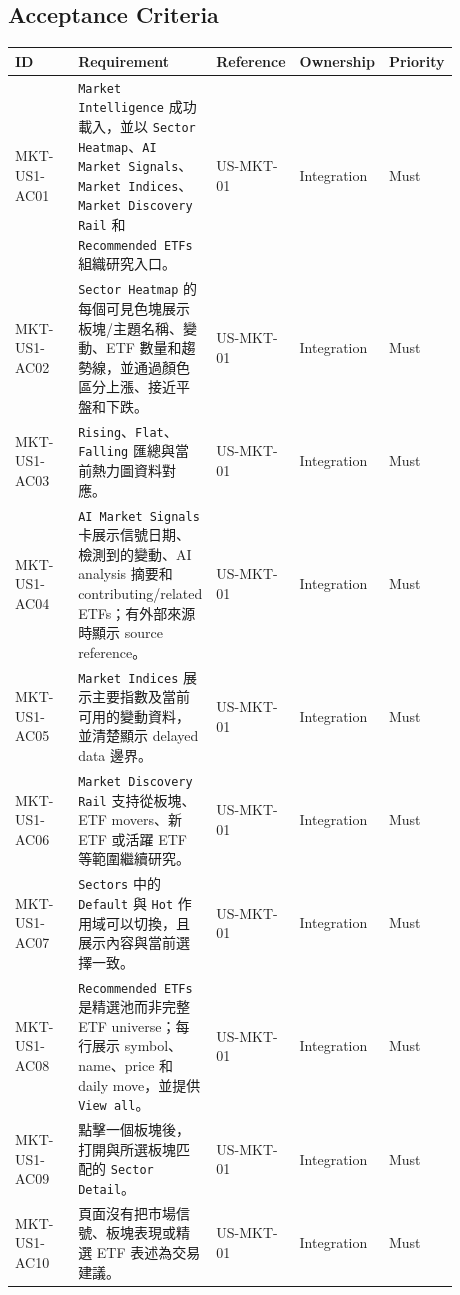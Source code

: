 \subsection{Acceptance Criteria}
\begingroup
\small
\begin{longtable}{L{0.18\linewidth}L{0.30\linewidth}L{0.18\linewidth}L{0.12\linewidth}L{0.10\linewidth}}
\toprule
\textbf{ID} & \textbf{Requirement} & \textbf{Reference} & \textbf{Ownership} & \textbf{Priority} \\
\midrule
MKT-US1-AC01 & \texttt{Market Intelligence} 成功載入，並以 \texttt{Sector Heatmap}、\texttt{AI Market Signals}、\texttt{Market Indices}、\texttt{Market Discovery Rail} 和 \texttt{Recommended ETFs} 組織研究入口。 & US-MKT-01 & Integration & Must \\
MKT-US1-AC02 & \texttt{Sector Heatmap} 的每個可見色塊展示板塊/\allowbreak{}主題名稱、變動、ETF 數量和趨勢線，並通過顏色區分上漲、接近平盤和下跌。 & US-MKT-01 & Integration & Must \\
MKT-US1-AC03 & \texttt{Rising}、\texttt{Flat}、\texttt{Falling} 匯總與當前熱力圖資料對應。 & US-MKT-01 & Integration & Must \\
MKT-US1-AC04 & \texttt{AI Market Signals} 卡展示信號日期、檢測到的變動、AI analysis 摘要和 contributing/\allowbreak{}related ETFs；有外部來源時顯示 source reference。 & US-MKT-01 & Integration & Must \\
MKT-US1-AC05 & \texttt{Market Indices} 展示主要指數及當前可用的變動資料，並清楚顯示 delayed data 邊界。 & US-MKT-01 & Integration & Must \\
MKT-US1-AC06 & \texttt{Market Discovery Rail} 支持從板塊、ETF movers、新 ETF 或活躍 ETF 等範圍繼續研究。 & US-MKT-01 & Integration & Must \\
MKT-US1-AC07 & \texttt{Sectors} 中的 \texttt{Default} 與 \texttt{Hot} 作用域可以切換，且展示內容與當前選擇一致。 & US-MKT-01 & Integration & Must \\
MKT-US1-AC08 & \texttt{Recommended ETFs} 是精選池而非完整 ETF universe；每行展示 symbol、name、price 和 daily move，並提供 \texttt{View all}。 & US-MKT-01 & Integration & Must \\
MKT-US1-AC09 & 點擊一個板塊後，打開與所選板塊匹配的 \texttt{Sector Detail}。 & US-MKT-01 & Integration & Must \\
MKT-US1-AC10 & 頁面沒有把市場信號、板塊表現或精選 ETF 表述為交易建議。 & US-MKT-01 & Integration & Must \\
\bottomrule
\end{longtable}
\endgroup
\prdhr
\hypertarget{us-mkt-02}{}
